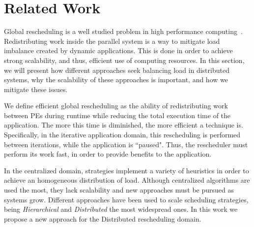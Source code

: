 \section{Related Work} \label{sec:rw}

%

Global rescheduling is a well studied problem in high performance computing~\cite{Deveci2015,Zheng2010}.
Redistributing work inside the parallel system is a way to mitigate load imbalance created by dynamic applications.
This is done in order to achieve strong scalability, and thus, efficient use of computing resources.
In this section, we will present how different approaches seek balancing load in distributed systems, why the scalability of these approaches is important, and how we mitigate these issues.

We define efficient global rescheduling as the ability of redistributing work between PEs during runtime while reducing the total execution time of the application.
The more this time is diminished, the more efficient a technique is.
Specifically, in the iterative application domain, this rescheduling is performed between iterations, while the application is ``paused".
Thus, the rescheduler must perform its work fast, in order to provide benefits to the application.

In the centralized domain, strategies implement a variety of heuristics in order to achieve an homogeneous distribution of load.
Although centralized algorithms are used the most, they lack scalability and new approaches must be pursued as systems grow.
Different approaches have been used to scale scheduling strategies, being \textit{Hierarchical} and \textit{Distributed} the most widespread ones.
In this work we propose a new approach for the Distributed rescheduling domain.


